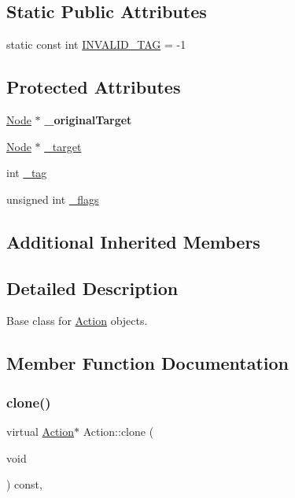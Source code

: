 \subsection*{Static Public Attributes}
\begin{DoxyCompactItemize}
\item 
static const int \hyperlink{classAction_a227309d0ca4dcbb1f80a68e3d1fdae71}{I\+N\+V\+A\+L\+I\+D\+\_\+\+T\+AG} = -\/1
\end{DoxyCompactItemize}
\subsection*{Protected Attributes}
\begin{DoxyCompactItemize}
\item 
\mbox{\label{classAction_ac12b3f77275c08f6e9fc63809e4f6a2d}} 
\hyperlink{classNode}{Node} $\ast$ {\bfseries \+\_\+original\+Target}
\item 
\hyperlink{classNode}{Node} $\ast$ \hyperlink{classAction_ab8c0116a71bb6addcb27b59f70e6a570}{\+\_\+target}
\item 
int \hyperlink{classAction_a7e04eca811f3f728862300b3e248d7c0}{\+\_\+tag}
\item 
unsigned int \hyperlink{classAction_afb213a69b3e48d43cbb6c28af6e5fbc1}{\+\_\+flags}
\end{DoxyCompactItemize}
\subsection*{Additional Inherited Members}


\subsection{Detailed Description}
Base class for \hyperlink{classAction}{Action} objects. 

\subsection{Member Function Documentation}
\mbox{\label{classAction_a6a047ad6b3bd200b0f86c7bb519b31ea}} 
\subsubsection{\texorpdfstring{clone()}{clone()}\hspace{0.1cm}{\footnotesize\ttfamily [1/2]}}
{\footnotesize\ttfamily virtual \hyperlink{classAction}{Action}$\ast$ Action\+::clone (\begin{DoxyParamCaption}\item[{void}]{ }\end{DoxyParamCaption}) const\hspace{0.3cm}{\ttfamily [inline]}, {\ttfamily [virtual]}}

